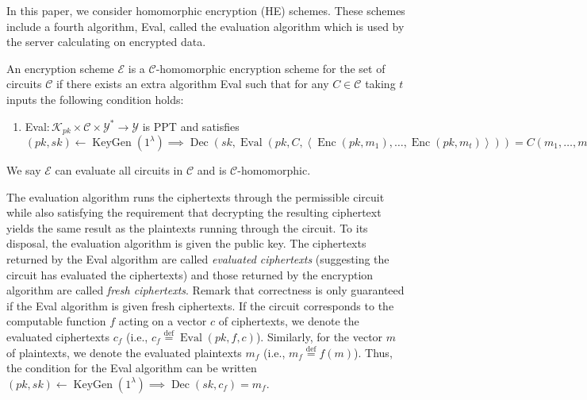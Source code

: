 In this paper, we consider homomorphic encryption (HE) schemes. These schemes include a fourth algorithm, Eval, called the evaluation algorithm which is used by the server calculating on encrypted data.
\begin{definition}
    \label{def:HE-scheme}
An encryption scheme $\mathcal{E}$ is a $\mathcal{C}$-homomorphic encryption scheme for the set of circuits $\mathcal{C}$ if there exists an extra algorithm Eval such that for any $C \in \mathcal{C}$ taking $t$ inputs the following condition holds:
\begin{enumerate}[label={$\bullet$}]
    \item  Eval$ \colon  \mathcal{K}_{pk} \times \mathcal{C} \times \mathcal{Y}^* \to \mathcal{Y}$ is PPT and satisfies $(pk,sk) \leftarrow \operatorname{KeyGen}(1^{\lambda}) \implies \operatorname{Dec}(sk, \operatorname{Eval}(pk, C, \left\langle \operatorname{Enc}(pk, m_1), \dots , \operatorname{Enc}(pk, m_t) \right\rangle)) = C(m_1, \ldots, m_t)$
\end{enumerate}
We say $\mathcal{E}$ can evaluate all circuits in $\mathcal{C}$ and is $\mathcal{C}$-homomorphic.
\end{definition}


The evaluation algorithm runs the ciphertexts through the permissible circuit while also satisfying the requirement that decrypting the resulting ciphertext yields the same result as the plaintexts running through the circuit. To its disposal, the evaluation algorithm is given the public key. The ciphertexts returned by the Eval algorithm are called \textit{evaluated ciphertexts} (suggesting the circuit has evaluated the ciphertexts) and those returned by the encryption algorithm are called \textit{fresh ciphertexts}. Remark that correctness is only guaranteed if the Eval algorithm is given fresh ciphertexts. If the circuit corresponds to the computable function $f$ acting on a vector $c$ of ciphertexts, we denote the evaluated ciphertexts $c_f$ (i.e., $c_f \stackrel{\mathrm{def}}{=} \operatorname{Eval}(pk, f, c)$). Similarly, for the vector $m$ of plaintexts, we denote the evaluated plaintexts $m_f$ (i.e., $m_f \stackrel{\mathrm{def}}{=} f(m)$). Thus, the condition for the Eval algorithm can be written $(pk,sk) \leftarrow \operatorname{KeyGen}(1^{\lambda}) \implies \operatorname{Dec}(sk, c_f) = m_f$.

